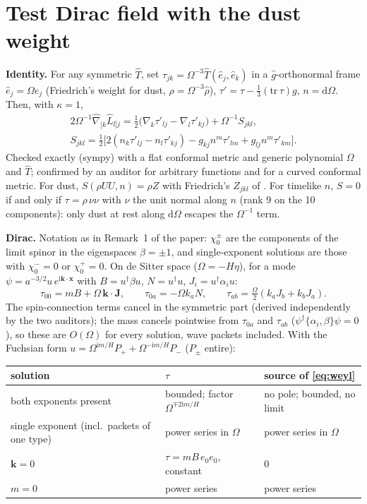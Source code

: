 \documentclass[11pt,a4paper]{article}
\newcommand{\dd}{\mathrm{d}}
\newcommand{\ii}{\mathrm{i}}
\begin{document}
\section{Test Dirac field with the dust weight}
\label{sec:rj}
\textbf{Identity.} For any symmetric $\hat T$, set $\tau_{jk}=\Omega^{-3}\hat T(\hat e_{j},\hat e_{k})$ in a $\hat g$-orthonormal frame $\hat e_{j}=\Omega e_{j}$ (Friedrich's weight for dust, $\rho=\Omega^{-3}\hat\rho$), $\tau'=\tau-\tfrac13(\mathrm{tr}\,\tau)g$, $n=\dd\Omega$. Then, with $\kappa=1$,
\begin{gather}
2\Omega^{-1}\hat\nabla_{[k}\hat L_{l]j}=\tfrac12\big(\nabla_{k}\tau'_{lj}-\nabla_{l}\tau'_{kj}\big)+\Omega^{-1}S_{jkl},\\
S_{jkl}=\tfrac12\big[2(n_{k}\tau'_{lj}-n_{l}\tau'_{kj})-g_{kj}n^{m}\tau'_{lm}+g_{lj}n^{m}\tau'_{km}\big].
\end{gather}
Checked exactly (sympy) with a flat conformal metric and generic polynomial $\Omega$ and $\hat T$; confirmed by an auditor for arbitrary functions and for a curved conformal metric. For dust, $S(\rho UU,n)=\rho Z$ with Friedrich's $Z_{jkl}$ of \cite[(3.20)]{Friedrich2017}. For timelike $n$, $S=0$ if and only if $\tau=\rho\,\nu\nu$ with $\nu$ the unit normal along $n$ (rank 9 on the 10 components): only dust at rest along $\dd\Omega$ escapes the $\Omega^{-1}$ term.

\textbf{Dirac.} Notation as in Remark~1 of the paper: $\chi_{0}^{\pm}$ are the components of the limit spinor in the eigenspaces $\beta=\pm1$, and single-exponent solutions are those with $\chi_{0}^{-}=0$ or $\chi_{0}^{+}=0$. On de Sitter space ($\Omega=-H\eta$), for a mode $\psi=a^{-3/2}u\,e^{\ii\mathbf{k}\cdot\mathbf{x}}$ with $B=u^{\dagger}\beta u$, $N=u^{\dagger}u$, $J_{i}=u^{\dagger}\alpha_{i}u$:
\begin{equation}
\tau_{00}=mB+\Omega\,\mathbf{k}\cdot\mathbf{J},\qquad \tau_{0a}=-\Omega k_{a}N,\qquad \tau_{ab}=\tfrac{\Omega}{2}(k_{a}J_{b}+k_{b}J_{a}).
\end{equation}
The spin-connection terms cancel in the symmetric part (derived independently by the two auditors); the mass cancels pointwise from $\tau_{0a}$ and $\tau_{ab}$ ($\psi^{\dagger}\{\alpha_{i},\beta\}\psi=0$), so these are $O(\Omega)$ for every solution, wave packets included. With the Fuchsian form $u=\Omega^{\ii m/H}P_{+}+\Omega^{-\ii m/H}P_{-}$ ($P_{\pm}$ entire):

\begin{center}\small
\begin{tabular}{lll}
\toprule
solution & $\tau$ & source of \eqref{eq:weyl}\\
\midrule
both exponents present & bounded; factor $\Omega^{\mp2\ii m/H}$ & no pole; bounded, no limit\\
single exponent (incl.\ packets of one type) & power series in $\Omega$ & power series in $\Omega$\\
$\mathbf{k}=0$ & $\tau=mB\,e_{0}e_{0}$, constant & $0$\\
$m=0$ & power series & power series\\
\bottomrule
\end{tabular}
\end{center}
\end{document}
